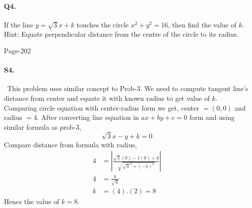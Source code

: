 \documentclass{article}
\begin{document}
\paragraph{Q4.}If the line $y = \sqrt{3}  x + k$ touches the circle $x^2 + y^2 = 16$, then find the value of $k$.\\
Hint: Equate perpendicular distance from the centre of the circle to its radius.
\begin{flushright}
Page-202
\end{flushright}

\paragraph{S4.}\
This problem uses similar concept to Prob-3. We need to compute tangent line's distance from center and equate it with known radius to get value of $k$. Comparing circle equation with center-radius form we get, center $=(0,0)$ and radius $=4$. After converting line equation in $ax+by+c=0$ form and using similar formula as prob-3, 
\begin{equation*}
    \sqrt{3}x-y+k=0
\end{equation*}
Compare distance from formula with radius,
\begin{align*}
    4&=\left|\frac{\sqrt{3}(0)-1(0)+k}{\sqrt{\sqrt{3}^2+(-1)^2}}\right|\\
    4&=\frac{k}{\sqrt{4}}\\
    k&=(4).(2)=8
\end{align*}
Hence the value of $k=8$.
\end{document}
